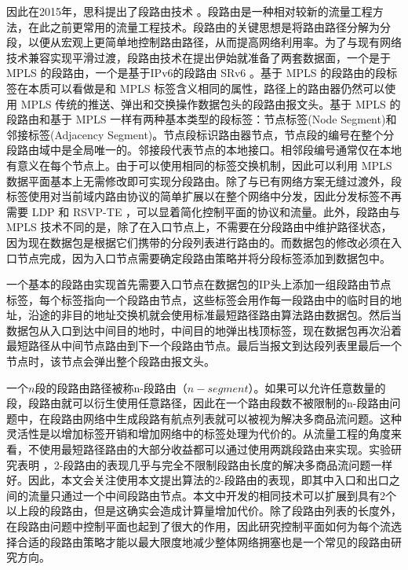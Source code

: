 因此在2015年，思科提出了段路由技术 \cite{SRARK}。段路由是一种相对较新的流量工程方法，在此之前更常用的流量工程技术。段路由的关键思想是将路由路径分解为分段，以便从宏观上更简单地控制路由路径，从而提高网络利用率。为了与现有网络技术兼容实现平滑过渡，段路由技术在提出伊始就准备了两套数据面，一个是于 \gls*{MPLS} 的段路由，一个是基于IPv6的段路由 \gls*{SRv6} 。基于 \gls*{MPLS} 的段路由的段标签在本质可以看做是和 \gls*{MPLS} 标签含义相同的属性，路径上的路由器仍然可以使用 \gls*{MPLS} 传统的推送、弹出和交换操作数据包头的段路由报文头。基于 \gls*{MPLS} 的段路由和基于 \gls*{MPLS} 一样有两种基本类型的段标签：节点标签(Node Segment)和邻接标签(Adjacency Segment)。节点段标识路由器节点，节点段的编号在整个分段路由域中是全局唯一的。邻接段代表节点的本地接口。相邻段编号通常仅在本地有意义在每个节点上。由于可以使用相同的标签交换机制，因此可以利用 \gls*{MPLS} 数据平面基本上无需修改即可实现分段路由。除了与已有网络方案无缝过渡外，段标签使用对当前域内路由协议的简单扩展以在整个网络中分发，因此分发标签不再需要 \gls*{LDP} 和 \gls*{RSVP-TE} ，可以显着简化控制平面的协议和流量。此外，段路由与 \gls*{MPLS} 技术不同的是，除了在入口节点上，不需要在分段路由中维护路径状态，因为现在数据包是根据它们携带的分段列表进行路由的。而数据包的修改必须在入口节点完成，因为入口节点需要确定段路由策略并将分段标签添加到数据包中。

一个基本的段路由实现首先需要入口节点在数据包的IP头上添加一组段路由节点标签，每个标签指向一个段路由节点，这些标签会用作每一段路由中的临时目的地址，沿途的非目的地址交换机就会使用标准最短路径路由算法路由数据包。然后当数据包从入口到达中间目的地时，中间目的地弹出栈顶标签，现在数据包再次沿着最短路径从中间节点路由到下一个段路由节点。最后当报文到达段列表里最后一个节点时，该节点会弹出整个段路由报文头。

一个$n$段的段路由路径被称n-段路由（$n-segment$）。如果可以允许任意数量的段，段路由就可以衍生使用任意路径，因此在一个路由段数不被限制的n-段路由问题中，在段路由网络中生成段路有航点列表就可以被视为解决多商品流问题。这种灵活性是以增加标签开销和增加网络中的标签处理为代价的。从流量工程的角度来看，不使用最短路径路由的大部分收益都可以通过使用两跳段路由来实现。实验研究表明 \cite{SIDLENGTHANALYSIS, SIDLENGTHPROVE} ，2-段路由的表现几乎与完全不限制段路由长度的解决多商品流问题一样好。因此，本文会关注使用本文提出算法的2-段路由的表现，即其中入口和出口之间的流量只通过一个中间段路由节点。本文中开发的相同技术可以扩展到具有2个以上段的段路由，但是这确实会造成计算量增加代价。除了段路由列表的长度外，在段路由问题中控制平面也起到了很大的作用，因此研究控制平面如何为每个流选择合适的段路由策略才能以最大限度地减少整体网络拥塞也是一个常见的段路由研究方向。

